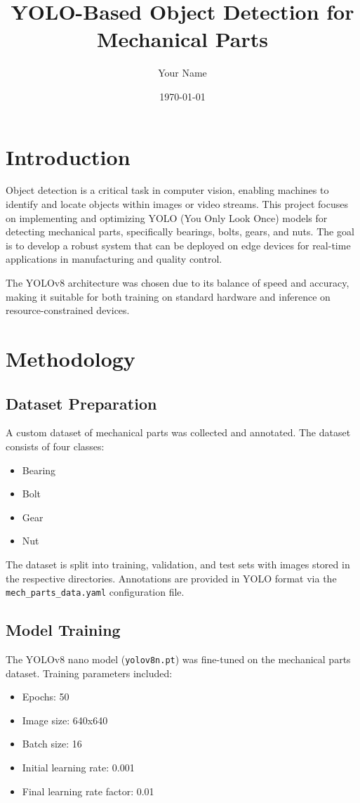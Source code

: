 \documentclass[12pt,a4paper]{article}
\title{YOLO-Based Object Detection for Mechanical Parts}
\author{Your Name}
\date{\today}
\begin{document}
\maketitle

\section{Introduction}

Object detection is a critical task in computer vision, enabling machines to identify and locate objects within images or video streams. This project focuses on implementing and optimizing YOLO (You Only Look Once) models for detecting mechanical parts, specifically bearings, bolts, gears, and nuts. The goal is to develop a robust system that can be deployed on edge devices for real-time applications in manufacturing and quality control.

The YOLOv8 architecture was chosen due to its balance of speed and accuracy, making it suitable for both training on standard hardware and inference on resource-constrained devices.

\section{Methodology}

\subsection{Dataset Preparation}

A custom dataset of mechanical parts was collected and annotated. The dataset consists of four classes:
\begin{itemize}
\item Bearing
\item Bolt
\item Gear
\item Nut
\end{itemize}

The dataset is split into training, validation, and test sets with images stored in the respective directories. Annotations are provided in YOLO format via the \texttt{mech\_parts\_data.yaml} configuration file.

\subsection{Model Training}

The YOLOv8 nano model (\texttt{yolov8n.pt}) was fine-tuned on the mechanical parts dataset. Training parameters included:
\begin{itemize}
\item Epochs: 50
\item Image size: 640x640
\item Batch size: 16
\item Initial learning rate: 0.001
\item Final learning rate factor: 0.01
\end{itemize}
\end{document}
